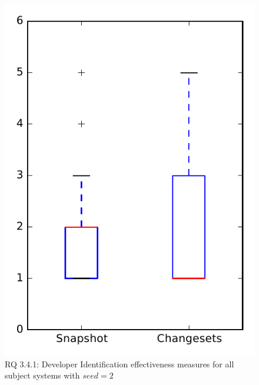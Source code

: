 
\begin{figure}
\centering
\includegraphics[height=0.4\textheight]{figures/dit_seed/rq1_overview_2}
\caption{RQ 3.4.1: Developer Identification effectiveness measures for all subject systems with $seed=2$}
\label{fig:dit_seed:rq1:overview}
\end{figure}
